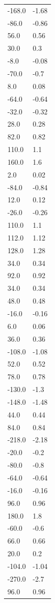 \begin{longtable}{ll}
-168.0 & -1.68 \\
-86.0 & -0.86 \\
56.0 & 0.56 \\
30.0 & 0.3 \\
-8.0 & -0.08 \\
-70.0 & -0.7 \\
8.0 & 0.08 \\
-64.0 & -0.64 \\
-32.0 & -0.32 \\
28.0 & 0.28 \\
82.0 & 0.82 \\
110.0 & 1.1 \\
160.0 & 1.6 \\
2.0 & 0.02 \\
-84.0 & -0.84 \\
12.0 & 0.12 \\
-26.0 & -0.26 \\
110.0 & 1.1 \\
112.0 & 1.12 \\
128.0 & 1.28 \\
34.0 & 0.34 \\
92.0 & 0.92 \\
34.0 & 0.34 \\
48.0 & 0.48 \\
-16.0 & -0.16 \\
6.0 & 0.06 \\
36.0 & 0.36 \\
-108.0 & -1.08 \\
52.0 & 0.52 \\
78.0 & 0.78 \\
-130.0 & -1.3 \\
-148.0 & -1.48 \\
44.0 & 0.44 \\
84.0 & 0.84 \\
-218.0 & -2.18 \\
-20.0 & -0.2 \\
-80.0 & -0.8 \\
-64.0 & -0.64 \\
-16.0 & -0.16 \\
96.0 & 0.96 \\
180.0 & 1.8 \\
-60.0 & -0.6 \\
66.0 & 0.66 \\
20.0 & 0.2 \\
-104.0 & -1.04 \\
-270.0 & -2.7 \\
96.0 & 0.96 \\

\end{longtable}
